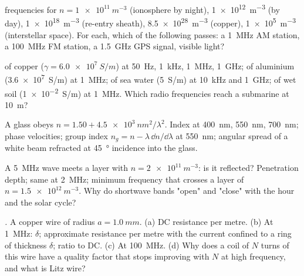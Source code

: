 \begin{exercise}[$\star$]\label{exo:b2:waves-in-media:1}
 frequencies for $n = \qty{1e11}{m^{-3}}$ (ionosphere by night),
\qty{1e12}{m^{-3}} (by day), \qty{1e18}{m^{-3}} (re-entry sheath), \qty{8.5e28}{m^{-3}}
(copper), \qty{1e5}{m^{-3}} (interstellar space). For each, which of the
following passes: a \qty{1}{MHz} AM station, a \qty{100}{MHz} FM station, a
\qty{1.5}{GHz} GPS signal, visible light?
\end{exercise}

\begin{exercise}[$\star$]\label{exo:b2:waves-in-media:2}
 of copper ($\gamma = \qty{6.0e7}{S/m}$) at \qty{50}{Hz}, \qty{1}{kHz},
\qty{1}{MHz}, \qty{1}{GHz}; of aluminium (\qty{3.6e7}{S/m}) at \qty{1}{MHz}; of sea
water (\qty{5}{S/m}) at \qty{10}{kHz} and \qty{1}{GHz}; of wet soil (\qty{1e-2}{S/m})
at \qty{1}{MHz}. Which radio frequencies reach a submarine at \qty{10}{m}?
\end{exercise}

\begin{exercise}[$\star$]\label{exo:b2:waves-in-media:3}
A glass obeys $n = 1.50 + \qty{4.5e3}{nm^2}/\lambda^2$. Index at \qty{400}{nm},
\qty{550}{nm}, \qty{700}{nm}; phase velocities; group index $n_g = n -
\lambda\,\dd n/\dd\lambda$ at \qty{550}{nm}; angular spread of a white beam
refracted at \qty{45}{\degree} incidence into the glass.
\end{exercise}

\begin{exercise}[$\star$]\label{exo:b2:waves-in-media:4}
A \qty{5}{MHz} wave meets a layer with $n = \qty{2e11}{m^{-3}}$: is it
reflected? Penetration depth; same at \qty{2}{MHz}; minimum frequency
that crosses a layer of $n = \qty{1.5e12}{m^{-3}}$. Why do shortwave
bands "open" and "close" with the hour and the solar cycle?
\end{exercise}

\begin{exercise}[$\star\star$]\label{exo:b2:waves-in-media:5}
\emph{.} A copper wire of radius $a = \qty{1.0}{mm}$. (a) DC
resistance per metre. (b) At \qty{1}{MHz}: $\delta$; approximate resistance
per metre with the current confined to a ring of thickness $\delta$;
ratio to DC. (c) At \qty{100}{MHz}. (d) Why does a coil of $N$ turns of
this wire have a quality factor that stops improving with $N$ at high
frequency, and what is Litz wire?
\end{exercise}

